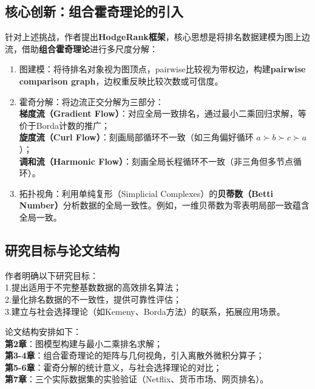 \documentclass[a4paper]{article}
\begin{document}
\subsection{核心创新：组合霍奇理论的引入}
针对上述挑战，作者提出\textbf{HodgeRank框架}，核心思想是将排名数据建模为图上边流，借助\textbf{组合霍奇理论}进行多尺度分解：
\begin{enumerate}
 \item 图建模：将待排名对象视为图顶点，pairwise比较视为带权边，构建\textbf{pairwise comparison graph}，边权重反映比较次数或可信度。
 \item 霍奇分解：将边流正交分解为三部分：\\
    \indent \textbf{梯度流（Gradient Flow）}：对应全局一致排名，通过最小二乘回归求解，等价于Borda计数的推广；\\
    \indent \textbf{旋度流（Curl Flow）}：刻画局部循环不一致（如三角偏好循环 \(a \succ b \succ c \succ a\)）；\\
    \indent \textbf{调和流（Harmonic Flow）}：刻画全局长程循环不一致（非三角但多节点循环）。
  
 \item 拓扑视角：利用单纯复形（Simplicial Complexes）的\textbf{贝蒂数（Betti Number）}分析数据的全局一致性。例如，一维贝蒂数为零表明局部一致蕴含全局一致。
\end{enumerate}
\subsection{研究目标与论文结构}
作者明确以下研究目标：\\
\indent 1.提出适用于不完整基数数据的高效排名算法；\\
\indent 2.量化排名数据的不一致性，提供可靠性评估；\\
\indent 3.建立与社会选择理论（如Kemeny、Borda方法）的联系，拓展应用场景。

论文结构安排如下：\\
\indent \textbf{第2章}：图模型构建与最小二乘排名求解；\\
\indent \textbf{第3-4章}：组合霍奇理论的矩阵与几何视角，引入离散外微积分算子；\\
\indent \textbf{第5-6章}：霍奇分解的统计意义，与社会选择理论的对比；\\
\indent \textbf{第7章}：三个实际数据集的实验验证（Netflix、货币市场、网页排名）。
\end{document}

